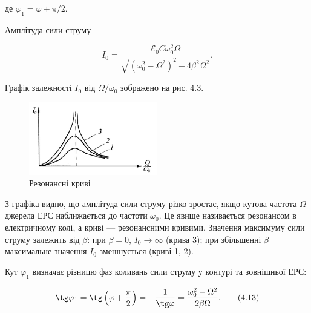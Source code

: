 \documentclass[12pt,a4paper]{article}
\begin{document}
    де $\varphi_1 = \varphi + \pi/2$.

    Амплітуда сили струму

    \vspace{0.5em}

    \begin{equation}
        I_0 = \frac{\mathcal{E}_0 C \omega_0^2 \Omega}{\sqrt{\left(\omega_0^2 - \Omega^2 \right)^2 + 4\beta^2\Omega^2}}.
        \tag{4.12}
    \end{equation}

    \vspace{0.5em}

    Графік залежності $I_0$ від $\Omega / \omega_0$ зображено на рис. 4.3.

    \begin{figure}[h!]

        \renewcommand{\thefigure}{4.\arabic{figure}} %

        \centering
        \includegraphics[width=0.5\textwidth]{4.3.png}
        \caption{Резонансні криві}
        \label{fig3:schema}

    \end{figure}

    З графіка видно, що амплітуда сили струму різко зростає,
    якщо кутова частота $\Omega$ джерела ЕРС наближається до частоти
    $\omega_0$. Це явище називається резонансом в електричному колі,
    а криві --- резонансними кривими.
    Значення максимуму сили струму залежить від
    $\beta$: при $\beta = 0$, $I_0 \rightarrow \infty$ (крива 3);
    при збільшенні $\beta$ максимальне значення $I_0$ зменшується (криві 1, 2).

    Кут $\varphi_1$ визначає різницю фаз коливань сили струму у контурі та зовнішньої ЕРС:

    \vspace{0.5em}

    \begin{equation}
        \tg \varphi_1 = \tg \left( \varphi + \frac{\pi}{2} \right) = - \frac{1}{\tg \varphi} = \frac{\omega_0^2 - \Omega^2}{2\beta \Omega}.
        \tag{4.13}
    \end{equation}
\end{document}
